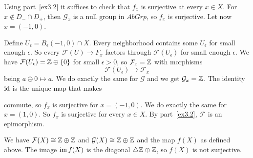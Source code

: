 \begin{exercise}{3}
\begin{enumerate}
{            Using part~\ref{ex3.2} it suffices to check that $f_x$ is surjective
            at every $x \in X$. For $x \notin D_- \cap D_+$, then
            $\mathcal{G}_x$ is a null group in $AbGrp$, so $f_x$ is surjective.
            Let now $x = (-1, 0)$.

            Define $U_\epsilon = B_\epsilon(-1, 0) \cap X$. Every neighborhood
            contains some $U_\epsilon$ for small enough $\epsilon$. So every
            $\mathcal{F}(U) \rightarrow F_x$ factors through
            $\mathcal{F}(U_\epsilon)$ for small enough $\epsilon$. We have
            $\mathcal{F}(U_\epsilon) = \mathbb{Z} \oplus \{0\}$ for small $\epsilon >
            0$, so $\mathcal{F}_x = \mathbb{Z}$ with morphisms
            \begin{equation*}
                \mathcal{F}(U_\epsilon) \rightarrow \mathcal{F}_x
            \end{equation*}
            being $a \oplus 0 \mapsto a$. We do exactly the same for
            $\mathcal{G}$ and we get $\mathcal{G}_x = \mathbb{Z}$. The identity $\operatorname{id}$ is
            the unique map that makes


            commute, so $f_x$ is surjective for $x = (-1, 0)$. We do exactly the
            same for $x = (1, 0)$. So $f_x$ is surjective for every $x \in X$. By
            part~\ref{ex3.2}, $\mathcal{F}$ is an epimorphism.

            We have $\mathcal{F}(X) \cong \mathbb{Z} \oplus \mathbb{Z}$ and $\mathcal{G}(X)
            \cong \mathbb{Z} \oplus \mathbb{Z}$ and the map $f(X)$ as defined above. The image
            $\operatorname{im} f(X)$ is the diagonal $\triangle \mathbb{Z} \oplus \mathbb{Z}$, so $f(X)$ is
            not surjective.
            }
    \end{enumerate}
\end{exercise}

